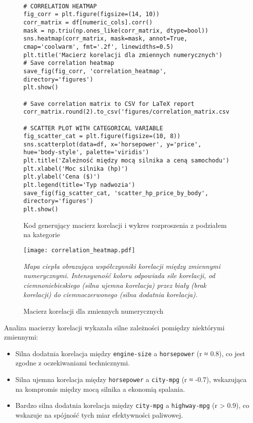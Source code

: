 \documentclass[12pt,a4paper]{article}
\newcommand{\kod}[2]{
    \begin{figure}[H]
        \begin{lstlisting}[style=pythonstyle]
#1
        \end{lstlisting}
        \caption{#2}
    \end{figure}
}
\begin{document}
\kod{
# CORRELATION HEATMAP
fig_corr = plt.figure(figsize=(14, 10))
corr_matrix = df[numeric_cols].corr()
mask = np.triu(np.ones_like(corr_matrix, dtype=bool))
sns.heatmap(corr_matrix, mask=mask, annot=True, cmap='coolwarm', fmt='.2f', linewidths=0.5)
plt.title('Macierz korelacji dla zmiennych numerycznych')
# Save correlation heatmap
save_fig(fig_corr, 'correlation_heatmap', directory='figures')
plt.show()

# Save correlation matrix to CSV for LaTeX report
corr_matrix.round(2).to_csv('figures/correlation_matrix.csv')

# SCATTER PLOT WITH CATEGORICAL VARIABLE
fig_scatter_cat = plt.figure(figsize=(10, 8))
sns.scatterplot(data=df, x='horsepower', y='price', hue='body-style', palette='viridis')
plt.title('Zależność między mocą silnika a ceną samochodu')
plt.xlabel('Moc silnika (hp)')
plt.ylabel('Cena ($)')
plt.legend(title='Typ nadwozia')
save_fig(fig_scatter_cat, 'scatter_hp_price_by_body', directory='figures')
plt.show()
}{Kod generujący macierz korelacji i wykres rozproszenia z podziałem na kategorie}

\begin{figure}[H]
    \centering
    \texttt{[image: correlation\_heatmap.pdf]}
    \caption{Macierz korelacji dla zmiennych numerycznych}
    \label{fig:correlation_matrix}
    \small\textit{Mapa ciepła obrazująca współczynniki korelacji między zmiennymi numerycznymi. Intensywność koloru odpowiada sile korelacji, od ciemnoniebieskiego (silna ujemna korelacja) przez biały (brak korelacji) do ciemnoczerwonego (silna dodatnia korelacja).}
\end{figure}

Analiza macierzy korelacji wykazała silne zależności pomiędzy niektórymi zmiennymi:
\begin{itemize}
    \item Silna dodatnia korelacja między \texttt{engine-size} a \texttt{horsepower} (r ≈ 0.8), co jest zgodne z oczekiwaniami technicznymi.
    
    \item Silna ujemna korelacja między \texttt{horsepower} a \texttt{city-mpg} (r ≈ -0.7), wskazująca na kompromis między mocą silnika a ekonomią spalania.
    
    \item Bardzo silna dodatnia korelacja między \texttt{city-mpg} a \texttt{highway-mpg} (r > 0.9), co wskazuje na spójność tych miar efektywności paliwowej.
\end{itemize}
\end{document}
